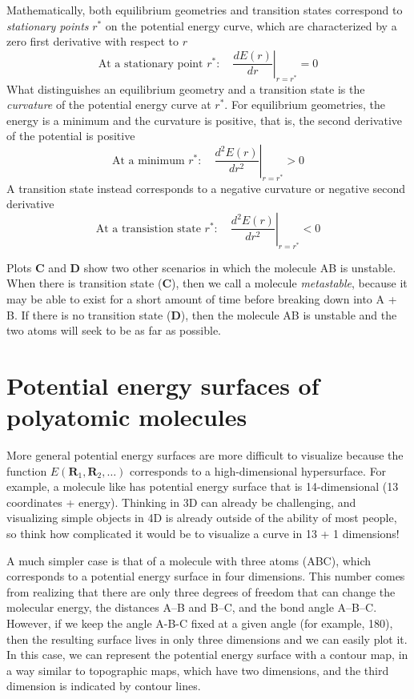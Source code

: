 \documentclass[../Main/chem371-notes.tex]{subfiles}
\begin{document}
Mathematically, both equilibrium geometries and transition states correspond to \emph{stationary points} $r^*$ on the potential energy curve, which are characterized by a zero first derivative with respect to $r$
\begin{equation}
\text{At a stationary point } r^*: \quad \left.\frac{d E(r)}{dr}\right|_{r = r^*} = 0
\end{equation}
What distinguishes an equilibrium geometry and a transition state is the \emph{curvature} of the potential energy curve at $r^*$.
For equilibrium geometries, the energy is a minimum and the curvature is positive, that is, the second derivative of the potential is positive
\begin{equation}
\text{At a minimum } r^*: \quad \left.\frac{d^2 E(r)}{dr^2}\right|_{r = r^*} > 0
\end{equation}
A transition state instead corresponds to a negative curvature or negative second derivative
\begin{equation}
\text{At a transistion state } r^*: \quad \left.\frac{d^2 E(r)}{dr^2}\right|_{r = r^*} < 0
\end{equation}

Plots \textbf{C} and \textbf{D} show two other scenarios in which the molecule AB is unstable.
When there is transition state (\textbf{C}), then we call a molecule \emph{metastable}, because it may be able to exist for a short amount of time before breaking down into A + B.
If there is no transition state (\textbf{D}), then the molecule AB is unstable and the two atoms will seek to be as far as possible.



\section{Potential energy surfaces of polyatomic molecules}

More general potential energy surfaces are more difficult to visualize because  the function $E(\mathbf{R}_1,  \mathbf{R}_2,\ldots)$ corresponds to a high-dimensional hypersurface.
For example, a molecule like  has potential energy surface that is 14-dimensional (13 coordinates + energy). Thinking in 3D can already be challenging, and visualizing simple objects in 4D is already outside of the ability of most people, so think how complicated it would be to visualize a curve in 13 + 1 dimensions! 

A much simpler case is that of a molecule with three atoms (ABC), which corresponds to a potential energy surface in four dimensions. This number comes from realizing that there are only three degrees of freedom that can change the molecular energy, the distances A--B and B--C, and the bond angle A--B--C.
However, if we keep the angle A-B-C fixed at a given angle (for example, 180\textdegree), then the resulting surface lives in only three dimensions and we can easily plot it.
In this case, we can represent the potential energy surface with a contour map, in a way similar to topographic maps, which have two dimensions, and the third dimension is indicated by contour lines.
\end{document}
